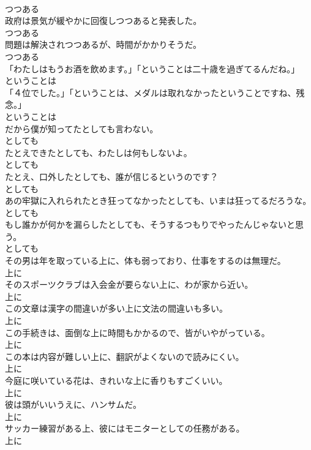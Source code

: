 \documentclass[8pt]{extreport}
\begin{document}
\begin{CJK}{UTF8}{min}
\\	つつある
\\	政府は景気が緩やかに回復しつつあると発表した。	
\\	つつある
\\	問題は解決されつつあるが、時間がかかりそうだ。	
\\	つつある
\\	「わたしはもうお酒を飲めます。」「ということは二十歳を過ぎてるんだね。」	
\\	ということは
\\	「４位でした。」「ということは、メダルは取れなかったということですね、残念。」	
\\	ということは
\\	だから僕が知ってたとしても言わない。	
\\	としても
\\	たとえできたとしても、わたしは何もしないよ。	
\\	としても
\\	たとえ、口外したとしても、誰が信じるというのです？	
\\	としても
\\	あの牢獄に入れられたとき狂ってなかったとしても、いまは狂ってるだろうな。	
\\	としても
\\	もし誰かが何かを漏らしたとしても、そうするつもりでやったんじゃないと思う。	
\\	としても
\\	その男は年を取っている上に、体も弱っており、仕事をするのは無理だ。	
\\	上に
\\	そのスポーツクラブは入会金が要らない上に、わが家から近い。	
\\	上に
\\	この文章は漢字の間違いが多い上に文法の間違いも多い。	
\\	上に
\\	この手続きは、面倒な上に時間もかかるので、皆がいやがっている。	
\\	上に
\\	この本は内容が難しい上に、翻訳がよくないので読みにくい。	
\\	上に
\\	今庭に咲いている花は、きれいな上に香りもすごくいい。	
\\	上に
\\	彼は頭がいいうえに、ハンサムだ。	
\\	上に
\\	サッカー練習がある上、彼にはモニターとしての任務がある。	
\\	上に

\end{CJK}
\end{document}
